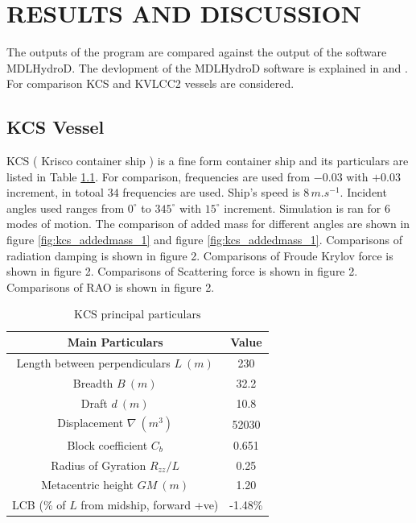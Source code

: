 \chapter{RESULTS AND DISCUSSION}
The outputs of the program are compared against the output of the software MDLHydroD. The devlopment of the 
MDLHydroD software is explained in \cite{guha2013development} and \cite{guha2015estimation}.
For comparison KCS and KVLCC2 vessels are considered. 

\section{KCS Vessel}
KCS ( Krisco container ship ) is a fine form container ship and its particulars are listed in Table 
\ref{tab:kcs_principal_particulars}. 
For comparison, frequencies are used from
$-0.03$ with $+0.03$ increment, in totoal $34$ frequencies are used. Ship's speed is $8\,\si{m.s^{-1}}$. Incident angles used 
ranges from $0^{\circ}$ to $345^{\circ}$ with $15^{\circ}$ increment. Simulation is ran for 6 modes of motion.  
The comparison of added mass for different angles are shown in figure \ref{fig:kcs_addedmass_1} and figure \ref{fig:kcs_addedmass_1}.
Comparisons of radiation damping is shown in figure 2. Comparisons of Froude Krylov force is shown in figure 2.
Comparisons of Scattering force is shown in figure 2. Comparisons of RAO is shown in figure 2.

\begin{table}[h]
    \centering
    \setlength{\tabcolsep}{10pt} %
    \renewcommand{\arraystretch}{1.17} %
    \begin{tabular}{|c|c|}
        \hline
        {\bf Main Particulars} & {\bf Value} \\
        \hline 
        Length between perpendiculars $L ~(m)$ & 230 \\ 
        Breadth $B ~(m)$ & 32.2  \\
        Draft $d ~(m)$ & 10.8  \\
        Displacement $\nabla ~(m^{3})$ & 52030  \\
        Block coefficient $C_{b}$ & 0.651   \\
        Radius of Gyration $R_{zz}/L$ & 0.25 \\
        Metacentric height $GM ~(m)$ & 1.20 \\
        LCB (\% of $L$ from midship, forward +ve) & -1.48\% \\
        \hline
    \end{tabular}
    \caption{$\text{KCS principal particulars}$}
    \label{tab:kcs_principal_particulars}
\end{table}



